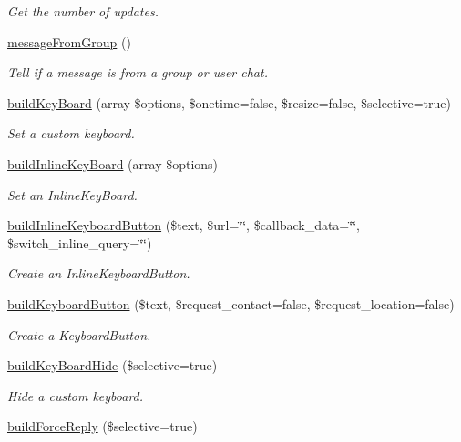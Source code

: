 \begin{DoxyCompactItemize}
\begin{DoxyCompactList}\small\item\em Get the number of updates. \end{DoxyCompactList}\item 
\hyperlink{class_telegram_a59b7bf91ea3b26d732f7536c2d65da19}{message\+From\+Group} ()
\begin{DoxyCompactList}\small\item\em Tell if a message is from a group or user chat. \end{DoxyCompactList}\item 
\hyperlink{class_telegram_a5c9619923ae1810aa340fa0e9acc1744}{build\+Key\+Board} (array \$options, \$onetime=false, \$resize=false, \$selective=true)
\begin{DoxyCompactList}\small\item\em Set a custom keyboard. \end{DoxyCompactList}\item 
\hyperlink{class_telegram_a81212e5e1fe0b3f72dd503a71577bbc4}{build\+Inline\+Key\+Board} (array \$options)
\begin{DoxyCompactList}\small\item\em Set an Inline\+Key\+Board. \end{DoxyCompactList}\item 
\hyperlink{class_telegram_acb9d27401f6095212d6baf7d40ee1981}{build\+Inline\+Keyboard\+Button} (\$text, \$url=\char`\"{}\char`\"{}, \$callback\+\_\+data=\char`\"{}\char`\"{}, \$switch\+\_\+inline\+\_\+query=\char`\"{}\char`\"{})
\begin{DoxyCompactList}\small\item\em Create an Inline\+Keyboard\+Button. \end{DoxyCompactList}\item 
\hyperlink{class_telegram_a611a52a2e9be838207b3943007a76b6c}{build\+Keyboard\+Button} (\$text, \$request\+\_\+contact=false, \$request\+\_\+location=false)
\begin{DoxyCompactList}\small\item\em Create a Keyboard\+Button. \end{DoxyCompactList}\item 
\hyperlink{class_telegram_a3a02a8bbaf6021f98871752bfd32de97}{build\+Key\+Board\+Hide} (\$selective=true)
\begin{DoxyCompactList}\small\item\em Hide a custom keyboard. \end{DoxyCompactList}\item 
\hypertarget{class_telegram_a34cfc8575c348ca3dd168b9611af4f1c}{}\hyperlink{class_telegram_a34cfc8575c348ca3dd168b9611af4f1c}{build\+Force\+Reply} (\$selective=true)\label{class_telegram_a34cfc8575c348ca3dd168b9611af4f1c}


\end{DoxyCompactItemize}
